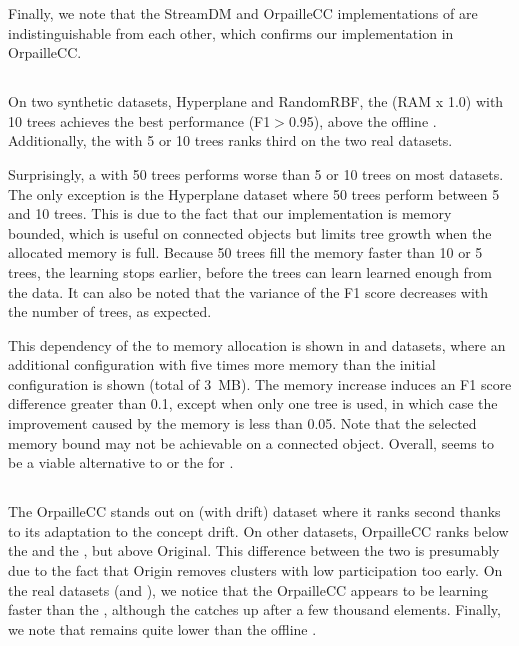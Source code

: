 Finally, we note that the StreamDM and OrpailleCC implementations of
\naivebayes are indistinguishable from each other, which confirms our
implementation in OrpailleCC.

\subsection{\mondrianforest}

On two synthetic datasets, Hyperplane and RandomRBF, the \mondrianforest (RAM x
1.0) with 10 trees achieves the best performance (F1$>$0.95), above the offline
\knn.  Additionally, the \mondrianforest with 5 or 10 trees ranks third on the
two real datasets. 

Surprisingly, a \mondrianforest with 50 trees performs worse than 5 or 10
trees on most datasets. The only exception is the Hyperplane dataset where
50 trees perform between 5 and 10 trees. This is due to the fact that
our \mondrianforest implementation is memory bounded, which is
useful on connected objects but limits tree growth when the allocated memory is
full. Because 50 trees fill the memory faster than 10 or 5 trees, the
learning stops earlier, before the trees can learn learned enough from the
data. It can also be noted that the variance of the F1 score decreases with
the number of trees, as expected.

This dependency of the \mondrianforest to memory allocation is shown in
\banosdataset and \recofitdataset datasets, where an additional
configuration with five times more memory than the initial configuration is
shown (total of 3~MB).  The memory increase induces an F1 score difference
greater than 0.1, except when only one tree is used, in
which case the improvement caused by the memory is less than 0.05. Note that the
selected memory bound may not be achievable on a connected object. Overall,
\mondrianforest seems to be a viable alternative to \naivebayes or the
\hoeffdingtree for \har.


\subsection{\mcnn}

The \mcnn OrpailleCC stands out on \banosdataset (with drift) dataset where it
ranks second thanks to its adaptation to the concept drift.  On other datasets,
\mcnn OrpailleCC ranks below the \mondrianforest and the \hoeffdingtree, but
above \mcnn Original. This difference between the two \mcnns is presumably due
to the fact that \mcnn Origin removes clusters with low participation too early.
On the real datasets (\banosdataset and \recofitdataset), we notice that the
\mcnn OrpailleCC appears to be learning faster than the \mondrianforest,
although the \mondrianforest catches up after a few thousand elements. Finally,
we note that \mcnn remains quite lower than the offline \knn.

